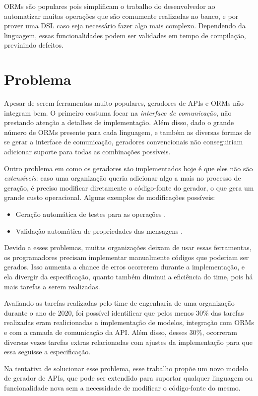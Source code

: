 ORMs são populares pois simplificam o trabalho do desenvolvedor ao automatizar muitas
operações que são comumente realizadas no banco, e por prover uma DSL caso seja
necessário fazer algo mais complexo. Dependendo da linguagem, essas funcionalidades
podem ser validades em tempo de compilação, previnindo defeitos.

\section{Problema}

Apesar de serem ferramentas muito populares, geradores de APIs e ORMs não integram
bem. O primeiro costuma focar na \textit{interface de comunicação}, não prestando
atenção a detalhes de implementação. Além disso, dado o grande número de ORMs
presente para cada linguagem, e também as diversas formas de se gerar a interface
de comunicação, geradores convencionais não conseguiriam adicionar suporte para
todas as combinações possíveis.

Outro problema em como os geradores são implementados hoje é que eles não são
\textit{extensíveis}: caso uma organização queria adicionar algo a mais no processo
de geração, é preciso modificar diretamente o código-fonte do gerador, o que gera
um grande custo operacional. Alguns exemplos de modificações possíveis:

\begin{itemize}
\item
  Geração automática de testes para as operações \cite{9159071}.
\item
  Validação automática de propriedades das mensagens \cite{envoy:protoc-gen-validate}.
\end{itemize}

Devido a esses problemas, muitas organizações deixam de usar essas ferramentas, os
programadores precisam implementar manualmente códigos que poderiam ser gerados.
Isso aumenta a chance de erros ocorrerem durante a implementação, e ela divergir da
especificação, quanto também diminui a eficiência do time, pois há mais tarefas a
serem realizadas.

Avaliando as tarefas realizadas pelo time de engenharia de uma organização durante o
ano de 2020, foi possível identificar que pelos menos 30\% das tarefas realizadas
eram realicionadas a implementação de modelos, integração com ORMs e com a camada
de comunicação da API. Além disso, desses 30\%, ocorreram diversas vezes tarefas
extras relacionadas com ajustes da implementação para que essa seguisse a especificação.

Na tentativa de solucionar esse problema, esse trabalho propõe um novo modelo de
gerador de APIs, que pode ser extendido para suportar qualquer linguagem ou funcionalidade
nova sem a necessidade de modificar o código-fonte do mesmo.
